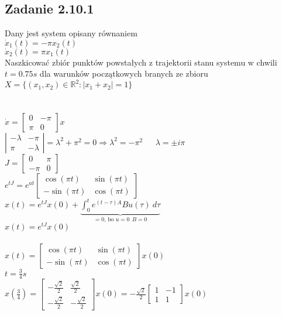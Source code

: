 \subsection*{Zadanie 2.10.1} {\color{darkgray}
	Dany jest system opisany równaniem\\
	$\dot{x}_1(t)=-\pi x_2(t)$\\
	$\dot{x}_2(t)=\pi x_1(t)$\\
	Naszkicować zbiór punktów powstałych z trajektorii stanu systemu w chwili $t=0.75s$ dla warunków początkowych branych ze zbioru $X=\{(x_1,x_2)\in \mathbb{R}^2:|x_1+x_2|=1\}$\\
}\lineh
\\\\
$\dot{x}=\left[\begin{array}{cc}0&-\pi\\\pi&0\end{array}\right]x$\\
$\left|\begin{array}{cc}-\lambda&-\pi\\\pi&-\lambda\end{array}\right|=\lambda^2+\pi^2=0\Rightarrow\lambda^2=-\pi^2 \ \ \ \ \ \ \ \lambda=\pm i\pi$\\
$J=\left[\begin{array}{cc}0&\pi\\-\pi&0\end{array}\right]$\\
$e^{tJ}=e^{at}\left[\begin{array}{cc}\cos(\pi t)&\sin(\pi t)\\-\sin(\pi t)&\cos(\pi t)\end{array}\right]$\\
$x(t)=e^{tJ}x(0)+\underbrace{\int_0^te^{(t-\tau)A}Bu(\tau)\ d\tau}_{=0 \text{, \ bo }u=0 \ \ B=0}$\\
$x(t)=e^{tJ}x(0)$\\\\
$x(t)=\left[\begin{array}{cc}\cos(\pi t)&\sin(\pi t)\\-\sin(\pi t)&\cos(\pi t)\end{array}\right]x(0)$\\
$t=\frac 34 s$\\
$x(\frac 34)=\left[\begin{array}{cc}-\frac{\sqrt{2}}{2}&\frac{\sqrt{2}}{2}\\-\frac{\sqrt{2}}{2}&-\frac{\sqrt{2}}{2}\end{array}\right]x(0)=-\frac{\sqrt{2}}{2}\left[\begin{array}{cc}1&-1\\1&1\end{array}\right]x(0)$\\
